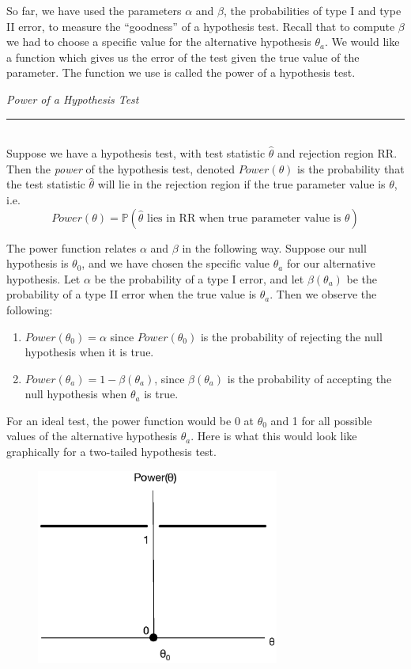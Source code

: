\documentclass[12pt]{article}
\theoremstyle{definition}
\theoremstyle{remark}
\def\P{{\mathbb P}}
\begin{document}
So far, we have used the parameters $\alpha$ and $\beta$, the probabilities of type I and type II error, to measure the ``goodness'' of a hypothesis test. Recall that to compute $\beta$ we had to choose a specific value for the alternative hypothesis $\theta_a$. We would like a function which gives us the error of the test given the true value of the parameter. The function we use is called the power of a hypothesis test.

\begin{framed}
\emph{Power of a Hypothesis Test}\\
  \rule{\dimexpr{}\fboxrule}{.1pt} \\
Suppose we have a hypothesis test, with test statistic $\hat{\theta}$ and rejection region RR. Then the \emph{power} of the hypothesis test, denoted $Power(\theta)$ is the probability that the test statistic $\hat{\theta}$ will lie in the rejection region if the true parameter value is $\theta$, i.e.
\[
Power(\theta) = \P(\hat{\theta} \text{ lies in RR when true parameter value is }\theta )
\]  
\end{framed}
The power function relates $\alpha$ and $\beta$ in the following way. Suppose our null hypothesis is $\theta_0$, and we have chosen the specific value $\theta_a$ for our alternative hypothesis. Let $\alpha$ be the probability of a type I error, and let $\beta(\theta_a)$ be the probability of a type II error when the true value is $\theta_a$. Then we observe the following:
\begin{enumerate}
\item $Power(\theta_0) = \alpha$ since $Power(\theta_0)$ is the probability of rejecting the null hypothesis when it is true.
\item $Power(\theta_a) = 1 - \beta(\theta_a)$, since $\beta(\theta_a)$ is the probability of accepting the null hypothesis when $\theta_a$ is true.
\end{enumerate}
For an ideal test, the power function would be 0 at $\theta_0$ and 1 for all possible values of the alternative hypothesis $\theta_a$. Here is what this would look like graphically for a two-tailed hypothesis test.

\begin{figure}[H]
\centering
\includegraphics[width=8cm]{idealpower}
\end{figure}
\end{document}
